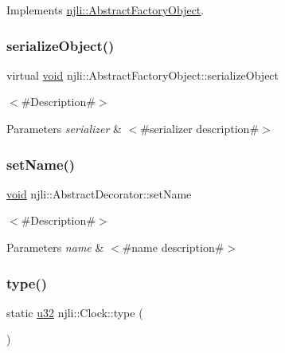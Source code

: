 Implements \mbox{\hyperlink{classnjli_1_1_abstract_factory_object_aad2fbe86fb3bdecf02918a96b9c57976}{njli\+::\+Abstract\+Factory\+Object}}.

\mbox{\label{classnjli_1_1_clock_a4fc4bcd9d1930911474210c047372fc0}} 
\subsubsection{\texorpdfstring{serialize\+Object()}{serializeObject()}}
{\footnotesize\ttfamily virtual \mbox{\hyperlink{_thread_8h_af1e856da2e658414cb2456cb6f7ebc66}{void}} njli\+::\+Abstract\+Factory\+Object\+::serialize\+Object}

$<$\#\+Description\#$>$


\begin{DoxyParams}{Parameters}
{\em serializer} & $<$\#serializer description\#$>$ \\
\hline
\end{DoxyParams}
\mbox{\label{classnjli_1_1_clock_a087eb5f8d9f51cc476f12f1d10a3cb95}} 
\subsubsection{\texorpdfstring{set\+Name()}{setName()}}
{\footnotesize\ttfamily \mbox{\hyperlink{_thread_8h_af1e856da2e658414cb2456cb6f7ebc66}{void}} njli\+::\+Abstract\+Decorator\+::set\+Name}

$<$\#\+Description\#$>$


\begin{DoxyParams}{Parameters}
{\em name} & $<$\#name description\#$>$ \\
\hline
\end{DoxyParams}
\mbox{\label{classnjli_1_1_clock_afa83aa79eb78706cf661e973a1258c2f}} 
\subsubsection{\texorpdfstring{type()}{type()}}
{\footnotesize\ttfamily static \mbox{\hyperlink{_util_8h_a10e94b422ef0c20dcdec20d31a1f5049}{u32}} njli\+::\+Clock\+::type (\begin{DoxyParamCaption}{ }\end{DoxyParamCaption})\hspace{0.3cm}{\ttfamily [static]}}

